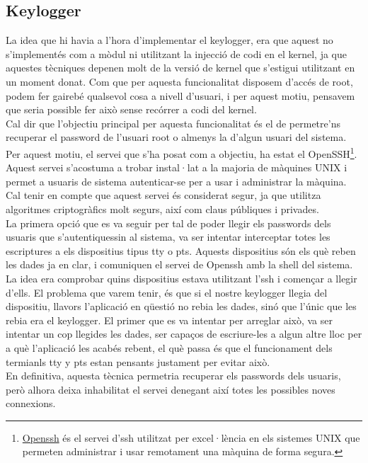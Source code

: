  
\subsection{Keylogger}
La idea que hi havia a l'hora d'implementar el keylogger, era que aquest no s'implementés com a mòdul ni
utilitzant la injecció de codi en el kernel, ja que aquestes tècniques depenen molt de la versió de kernel que 
s'estigui utilitzant en un moment donat. Com que per aquesta funcionalitat disposem d'accés de root, podem
fer gairebé qualsevol cosa a nivell d'usuari, i per aquest motiu, pensavem que seria possible fer això sense recórrer
a codi del kernel.\\

Cal dir que l'objectiu principal per aquesta funcionalitat és el de permetre'ns recuperar el password de l'usuari
root o almenys la d'algun usuari del sistema. Per aquest motiu, el servei que s'ha posat com a objectiu, ha estat el OpenSSH\footnote{\href{http://www.openssh.com/}{Openssh} és 
el servei d'ssh utilitzat per excel·lència en els sistemes UNIX que permeten administrar i usar remotament una màquina de 
forma segura.}.
Aquest servei s'acostuma a trobar instal·lat a la majoria de màquines UNIX i permet a usuaris de sistema
autenticar-se per a usar i administrar la màquina. Cal tenir en compte que aquest servei és considerat segur,
ja que utilitza algoritmes criptogràfics molt segurs, així com claus públiques i privades.\\

La primera opció que es va seguir per tal de poder llegir els passwords dels usuaris que s'autentiquessin al sistema, va ser intentar 
interceptar totes les escriptures a els dispositius tipus tty o pts. Aquests dispositius són els què reben 
les dades ja en clar, i comuniquen el servei de Openssh amb la shell del sistema. \\
La idea era comprobar quins dispositius estava utilitzant l'ssh i començar a llegir d'ells. El problema que
varem tenir, és que si el nostre keylogger llegia del dispositiu, llavors l'aplicació en qüestió no rebia les
dades, sinó que l'únic que les rebia era el keylogger. El primer que es va intentar per arreglar això,
va ser intentar un cop llegides les dades, ser capaços de escriure-les a algun altre lloc per a què
l'aplicació les acabés rebent, el què passa és que el funcionament dels termianls tty y pts estan pensants
justament per evitar això.\\

En definitiva, aquesta tècnica permetria recuperar els passwords dels usuaris, però alhora deixa inhabilitat el servei denegant així 
totes les possibles noves connexions. \\

